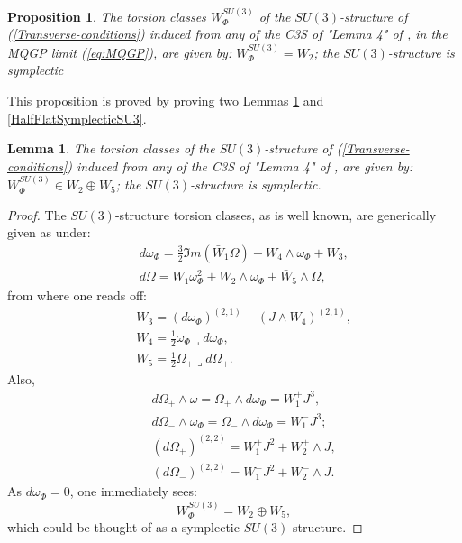 \documentclass[a4paper,11pt,fleqn]{article}
\theoremstyle{plain}
\newtheorem{lemma}[theorem]{Lemma}
\newtheorem{proposition}[theorem]{Proposition}
\theoremstyle{definition}
\begin{document}
\noindent \begin{proposition}\label{proposition}The torsion classes $W_\Phi^{SU(3)}$ of the $SU(3)$-structure of (\ref{Transverse-conditions}) induced from any of the C3S of "Lemma 4" of \cite{ACMS}, in the MQGP limit (\ref{eq:MQGP}), are given by: $W_\Phi^{SU(3)} = W_2$; the $SU(3)$-structure is symplectic \end{proposition}
This proposition is proved by proving two Lemmas \ref{LemmaSymplecticSU3} and \ref{HalfFlatSymplecticSU3}.
\noindent 
\begin{lemma}
\label{LemmaSymplecticSU3}
 The torsion classes of the $SU(3)$-structure of (\ref{Transverse-conditions}) induced from any of the C3S of "Lemma 4" of \cite{ACMS}, are given by:
$W_\Phi^{SU(3)} \in W_2\oplus W_5$; the $SU(3)$-structure is symplectic.
\end{lemma}

\begin{proof}
 The $SU(3)$-structure torsion classes, as is well known, are generically given as under:
\begin{eqnarray}
\label{SU3-torsion-defs}
& & d\omega_\Phi = \frac{3}{2}\Im m\left(\bar{W}_1\Omega\right) + W_4\wedge\omega_\Phi + W_3,\nonumber\\
& & d\Omega = W_1\omega_\Phi^2 + W_2\wedge\omega_\Phi + \bar{W}_5\wedge\Omega,
\end{eqnarray}
from where one reads off:
\begin{eqnarray}
\label{W345}
& & W_3 = \left(d\omega_\Phi\right)^{(2,1)} - \left(J\wedge W_4\right)^{(2,1)},\nonumber\\
& & W_4 = \frac{1}{2}\omega_\Phi\lrcorner d\omega_\Phi,\nonumber\\
& & W_5 = \frac{1}{2}\Omega_+\lrcorner d\Omega_+.
\end{eqnarray}
Also, 
\begin{eqnarray}
\label{W12}
& & d\Omega_+\wedge\omega = \Omega_+\wedge d\omega_\Phi = W_1^+J^3,\nonumber\\
& & d\Omega_-\wedge\omega_\Phi = \Omega_-\wedge d\omega_\Phi = W_1^-J^3;\nonumber\\
& & \left(d\Omega_+\right)^{(2,2)} = W_1^+ J^2 + W_2^+\wedge J,\nonumber\\
& & \left(d\Omega_-\right)^{(2,2)} = W_1^- J^2 + W_2^-\wedge J.
\end{eqnarray}
As $d\omega_\Phi=0$, one immediately sees:
\begin{equation}
\label{SU3-torsion-CS}
W_\Phi^{SU(3)} = W_2\oplus W_5,
\end{equation}
which could be thought of as a symplectic $SU(3)$-structure. 
\end{proof}
\end{document}
